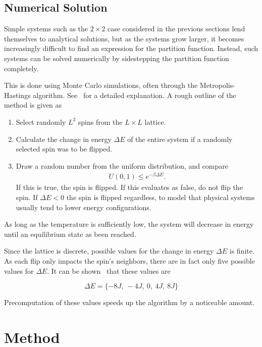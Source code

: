 \documentclass[aps,reprint]{revtex4-1}
\begin{document}
\subsection{Numerical Solution}
\label{sec:numerical-solution}

Simple systems such as the \(2\times 2\) case considered in the
previous sections lend themselves to analytical solutions, but as the systems
grow larger, it becomes increasingly difficult to find an expression for the
partition function. Instead, such systems can be solved numerically by
sidestepping the partition function completely.

This is done using Monte Carlo simulations, often through the
Metropolis-Hastings algorithm. See~\cite{physicslectures} for a detailed
explanation. A rough outline of the method is given as

\begin{enumerate}
  \item Select randomly $L^2$ spins from the \(L\times L\) lattice.
  \item Calculate the change in energy $\Delta E$ of the entire system if a randomly selected spin was to
  be flipped.
  \item Draw a random number from the uniform distribution, and compare
  \begin{align*}
    U(0,1) \leq e^{-\beta \Delta E}.
  \end{align*}
  If this is true, the spin is flipped. If this evaluates as false, do not flip
  the spin. If $\Delta E < 0$ the spin is flipped regardless, to model that physical
  systems usually tend to lower energy configurations.
\end{enumerate}

As long as the temperature is sufficiently low, the system will decrease in
energy until an equilibrium state as been reached.

Since the lattice is discrete, possible values for the change in energy \(\Delta
E\) is finite. As each flip only impacts the spin's neighbors, there are in fact
only five possible values for \(\Delta E\). It can be shown~\cite{physicslectures}
that these values are

\begin{equation*}
  \Delta E = \{-8J,\: -4J,\: 0,\: 4J,\: 8J\}
\end{equation*}

Precomputation of these values speeds up the algorithm by a noticeable amount.

\section{Method}
\label{sec:method}
\end{document}
